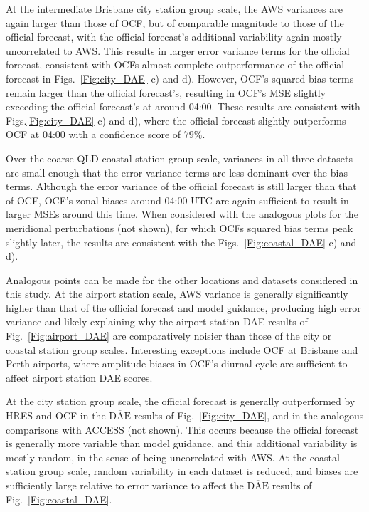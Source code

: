 \documentclass{ametsoc}
\begin{document}
At the intermediate Brisbane city station group scale, the AWS variances are again larger than those of OCF, but of comparable magnitude to those of the official forecast, with the official forecast's additional variability again mostly uncorrelated to AWS. This results in larger error variance terms for the official forecast, consistent with OCFs almost complete outperformance of the official forecast in Figs.~\ref{Fig:city_DAE} c) and d). However, OCF's squared bias terms remain larger than the official forecast's, resulting in OCF's MSE slightly exceeding the official forecast's at around 04:00. These results are consistent with Figs.\ref{Fig:city_DAE} c) and d), where the official forecast slightly outperforms OCF at 04:00 with a confidence score of $79\%$.  

Over the coarse QLD coastal station group scale, variances in all three datasets are small enough that the error variance terms are less dominant over the bias terms. Although the error variance of the official forecast is still larger than that of OCF, OCF's zonal biases around 04:00 UTC are again sufficient to result in larger MSEs around this time. When considered with the analogous plots for the meridional perturbations (not shown), for which OCFs squared bias terms peak slightly later, the results are consistent with the Figs.~\ref{Fig:coastal_DAE} c) and d). 

Analogous points can be made for the other locations and datasets considered in this study. At the airport station scale, AWS variance is generally significantly higher than that of the official forecast and model guidance, producing high error variance and likely explaining why the airport station DAE results of Fig.~\ref{Fig:airport_DAE} are comparatively noisier than those of the city or coastal station group scales. Interesting exceptions include OCF at Brisbane and Perth airports, where amplitude biases in OCF's diurnal cycle are sufficient to affect airport station DAE scores.

At the city station group scale, the official forecast is generally outperformed by HRES and OCF in the $\overline{\text{DAE}}$ results of Fig.~\ref{Fig:city_DAE}, and in the analogous comparisons with ACCESS (not shown). This occurs because the official forecast is generally more variable than model guidance, and this additional variability is mostly random, in the sense of being uncorrelated with AWS. At the coastal station group scale, random variability in each dataset is reduced, and biases are sufficiently large relative to error variance to affect the $\overline{\text{DAE}}$ results of Fig.~\ref{Fig:coastal_DAE}.
\end{document}
